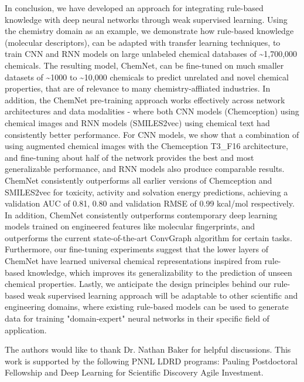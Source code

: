 \documentclass[sigconf]{acmart}
\begin{document}
In conclusion, we have developed an approach for integrating rule-based knowledge with deep neural networks through weak supervised learning. Using the chemistry domain as an example, we demonstrate how rule-based knowledge (molecular descriptors), can be adapted with transfer learning techniques, to train CNN and RNN models on large unlabeled chemical databases of \textasciitilde1,700,000 chemicals. The resulting model, ChemNet, can be fine-tuned on much smaller datasets of \textasciitilde1000 to \textasciitilde10,000 chemicals to predict unrelated and novel chemical properties, that are of relevance to many chemistry-affliated industries. In addition, the ChemNet pre-training approach works effectively across network architectures and data modalities - where both CNN models (Chemception) using chemical images and RNN models (SMILES2vec) using chemical text had consistently better performance. For CNN models, we show that a combination of using augmented chemical images with the Chemception T3\_F16 architecture, and fine-tuning about half of the network provides the best and most generalizable performance, and RNN models also produce comparable results. ChemNet consistently outperforms all earlier versions of Chemception and SMILES2vec for toxicity, activity and solvation energy predictions, achieving a validation AUC of 0.81, 0.80 and validation RMSE of 0.99 kcal/mol respectively. In addition, ChemNet consistently outperforms contemporary deep learning models trained on engineered features like molecular fingerprints, and outperforms the current state-of-the-art ConvGraph algorithm for certain tasks. Furthermore, our fine-tuning experiments suggest that the lower layers of ChemNet have learned universal chemical representations inspired from rule-based knowledge, which improves its generalizability to the prediction of unseen chemical properties. Lastly, we anticipate the design principles behind our rule-based weak supervised learning approach will be adaptable to other scientific and engineering domains, where existing rule-based models can be used to generate data for training "domain-expert" neural networks in their specific field of application.


\begin{acks}
The authors would like to thank Dr. Nathan Baker for helpful discussions. This work is supported by the following PNNL LDRD programs: Pauling Postdoctoral Fellowship and Deep Learning for Scientific Discovery Agile Investment.
\end{acks}



\end{document}
